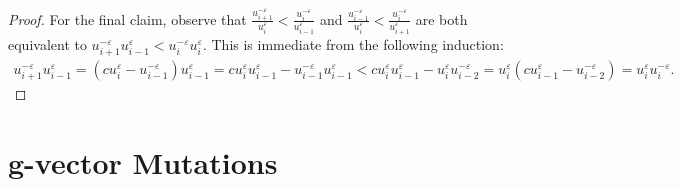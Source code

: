 \documentclass{amsart}
\numberwithin{theorem}{section}
\newcommand{\bfg}{\boldsymbol{g}}
\begin{document}
\begin{proof}
    For the final claim, observe that $\frac{u_{i+1}^{-\varepsilon}}{u_i^\varepsilon}<\frac{u_i^{-\varepsilon}}{u_{i-1}^\varepsilon}$ and $\frac{u_{i-1}^{-\varepsilon}}{u_i^\varepsilon}<\frac{u_i^{-\varepsilon}}{u_{i+1}^\varepsilon}$ are both equivalent to $u_{i+1}^{-\varepsilon}u_{i-1}^\varepsilon<u_i^{-\varepsilon}u_i^\varepsilon$.
    This is immediate from the following induction:
    \begin{align*}
      u_{i+1}^{-\varepsilon}u_{i-1}^\varepsilon
      =(cu_i^\varepsilon-u_{i-1}^{-\varepsilon})u_{i-1}^\varepsilon
      =cu_i^\varepsilon u_{i-1}^\varepsilon-u_{i-1}^{-\varepsilon} u_{i-1}^\varepsilon
      <cu_i^\varepsilon u_{i-1}^\varepsilon-u_i^\varepsilon u_{i-2}^{-\varepsilon}
      =u_i^\varepsilon(cu_{i-1}^\varepsilon-u_{i-2}^{-\varepsilon})
      =u_i^\varepsilon u_i^{-\varepsilon}.
    \end{align*}
  \end{proof}


\section{$\bfg$-vector Mutations}
\label{sec:tropical}
\end{document}
